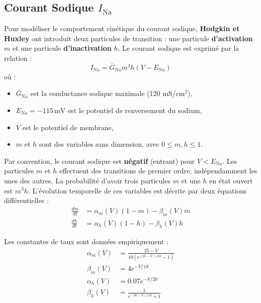 \documentclass[10pt,french]{beamer}
\begin{document}
	\subsection{Courant Sodique $I_{\text{Na}}$}
	\begin{frame}
		Pour modéliser le comportement cinétique du courant sodique, \textbf{Hodgkin et Huxley} ont introduit deux particules de transition : une particule \textbf{d'activation} $m$ et une particule \textbf{d'inactivation} $h$. Le courant sodique est exprimé par la relation :
		\begin{equation}
			I_{\text{Na}} = \bar{G}_{\text{Na}} m^3 h (V - E_{\text{Na}})
			\label{eq:6}
		\end{equation}
		où :
		\begin{itemize}
			\item $\bar{G}_{\text{Na}}$ est la conductance sodique maximale (120 mS/cm$^2$),
			\item $E_{\text{Na}} = -115\, \text{mV}$ est le potentiel de renversement du sodium,
			\item $V$ est le potentiel de membrane,
			\item $m$ et $h$ sont des variables sans dimension, avec $0 \leq m,h \leq 1$.
		\end{itemize}
	\end{frame}
	\begin{frame}
		Par convention, le courant sodique est \textbf{négatif} (entrant) pour $V < E_{\text{Na}}$. 
		Les particules $m$ et $h$ effectuent des transitions de premier ordre, indépendamment les unes des autres. La probabilité d’avoir trois particules $m$ et une $h$ en état ouvert est $m^3 h$. L’évolution temporelle de ces variables est décrite par deux équations différentielles :
		\begin{align}
			\frac{dm}{dt} &= \alpha_m(V)(1 - m) - \beta_m(V) m \label{eq:7} \\
			\frac{dh}{dt} &= \alpha_h(V)(1 - h) - \beta_h(V) h     \label{eq:8}
		\end{align}
	\end{frame}
	\begin{frame}
		Les constantes de taux sont données empiriquement :
		\begin{align}
			\alpha_m(V) &= \frac{25 - V}{10 \left( e^{(25 - V)/10} - 1 \right)} \label{eq:9} \\
			\beta_m(V) &= 4 e^{-V/18} \label{eq:10} \\
			\alpha_h(V) &= 0.07 e^{-V/20} \label{eq:11} \\
			\beta_h(V) &= \frac{1}{e^{(30 - V)/10} + 1}     \label{eq:12}
		\end{align}
	\end{frame}
	
\end{document}
